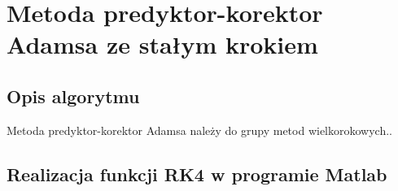 \documentclass[a4paper, 11pt]{article}
\begin{document}
\section{Metoda predyktor-korektor Adamsa ze stałym krokiem}
\subsection{Opis algorytmu}
Metoda predyktor-korektor Adamsa należy do grupy metod wielkorokowych..

\subsection{Realizacja funkcji RK4 w programie Matlab}
\begin{lstlisting}

\end{lstlisting}
\end{document}
